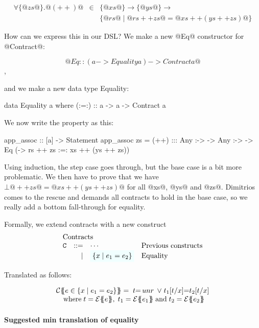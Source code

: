 \[\begin{array}{rcl}
\forall \{ @zs@ \} . @(++)@ & \in & \{ @xs@ \} \to \{ @ys@ \} \to \\
                            &     & \{ @rs@ \mid @rs ++ zs@ = @xs ++ (ys ++ zs)@ \}
\end{array}\]

How can we express this in our DSL? We make a new @Eq@ constructor for @Contract@:

$$@Eq :: (a -> Equality a) -> Contract a@$$,

and we make a new data type Equality:

\begin{code}
data Equality a where
    (:=:) :: a -> a -> Contract a
\end{code}

We now write the property as this:

\begin{code}
app_assoc :: [a] -> Statement
app_assoc zs = (++) :::
    Any :-> \xs -> Any :-> \ys -> Eq
        (\rs -> rs ++ zs :=: xs ++ (ys ++ zs))
\end{code}

Using induction, the step case goes through, but the base case is a
bit more problematic. We then have to prove that we have
$\bot @++ zs@ = @xs ++ (ys ++ zs)@$ for all @xs@, @ys@ and @zs@.
Dimitrios comes to the rescue and demands all contracts to hold in the
base case, so we really add a bottom fall-through for equality.

Formally, we extend contracts with a new construct
\[\begin{array}{lrll}
\multicolumn{3}{l}{\text{Contracts}} \\
 \Ct & ::=  & \cdots                 & \text{Previous constructs} \\
     & \mid & \formula{\{ x \mid e_1 = e_2 \}} & \text{Equality}
\end{array}\]

Translated as follows:

\[\begin{array}{l}
\ctrans{\Sigma}{\Gamma}{e \in \{x \mid e_1 = e_2 \}}
  = \; t{=}\unr \; \lor \; t_1[t/x]{=}t_2[t/x] \\
\quad \text{where} \;
   t = \etrans{\Sigma}{\Gamma}{e}, \;
   t_1 = \etrans{\Sigma}{\Gamma}{e_1} \; \text{and} \;
   t_2 = \etrans{\Sigma}{\Gamma}{e_2}
\end{array}\]

\paragraph{Suggested min translation of equality}

